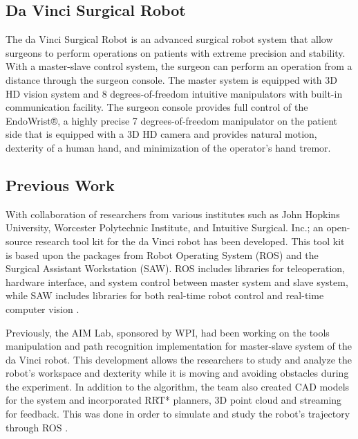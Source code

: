 \documentclass[conference]{IEEEtran}
\begin{document}
\subsection{Da Vinci Surgical Robot}
The da Vinci Surgical Robot is an advanced surgical robot system that allow surgeons to perform operations on patients with extreme precision and stability. With a master-slave control system, the surgeon can perform an operation from a distance through the surgeon console. The master system is equipped with 3D HD vision system and 8 degrees-of-freedom intuitive manipulators with built-in communication facility. The surgeon console provides full control of the EndoWrist®, a highly precise 7 degrees-of-freedom manipulator on the patient side that is equipped with a 3D HD camera and provides natural motion, dexterity of a human hand, and minimization of the operator's hand tremor.

\subsection{Previous Work}
With collaboration of researchers from various institutes such as John Hopkins University, Worcester Polytechnic Institute, and Intuitive Surgical. Inc.; an open-source research tool kit for the da Vinci robot has been developed. This tool kit is based upon the packages from Robot Operating System (ROS) and the Surgical Assistant Workstation (SAW). ROS includes libraries for teleoperation, hardware interface, and system control between master system and slave system, while SAW includes libraries for both real-time robot control and real-time computer vision \cite{1}.

Previously, the AIM Lab, sponsored by WPI, had been working on the tools manipulation and path recognition implementation for master-slave system of the da Vinci robot. This development allows the researchers to study and analyze the robot's workspace and dexterity while it is moving and avoiding obstacles during the experiment. In addition to the algorithm, the team also created CAD models for the system and incorporated RRT* planners, 3D point cloud and streaming for feedback. This was done in order to simulate and study the robot's trajectory through ROS \cite{2}. 
\end{document}
